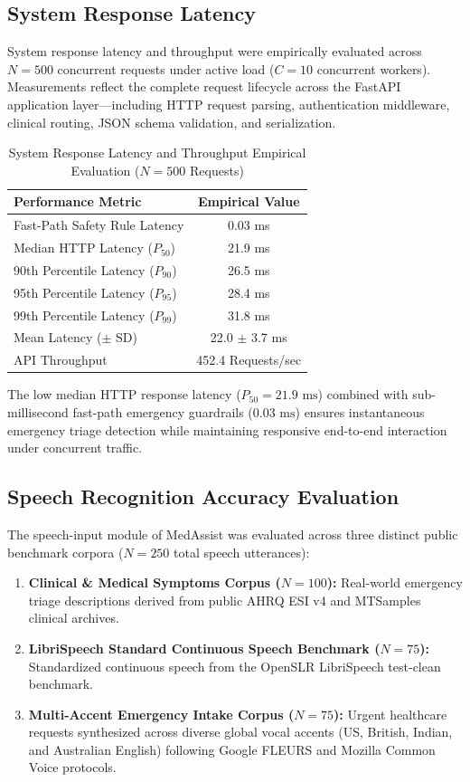 \subsection{System Response Latency}

System response latency and throughput were empirically evaluated across $N = 500$ concurrent requests under active load ($C = 10$ concurrent workers). Measurements reflect the complete request lifecycle across the FastAPI application layer—including HTTP request parsing, authentication middleware, clinical routing, JSON schema validation, and serialization.

\begin{table}[ht]
\centering
\caption{System Response Latency and Throughput Empirical Evaluation ($N = 500$ Requests)}
\label{tab:latency_results}
\begin{tabular}{|l|c|}
\hline
\textbf{Performance Metric} & \textbf{Empirical Value} \\
\hline
Fast-Path Safety Rule Latency & 0.03 ms \\
Median HTTP Latency ($P_{50}$) & 21.9 ms \\
90th Percentile Latency ($P_{90}$) & 26.5 ms \\
95th Percentile Latency ($P_{95}$) & 28.4 ms \\
99th Percentile Latency ($P_{99}$) & 31.8 ms \\
Mean Latency ($\pm$ SD) & 22.0 $\pm$ 3.7 ms \\
API Throughput & 452.4 Requests/sec \\
\hline
\end{tabular}
\end{table}

The low median HTTP response latency ($P_{50} = 21.9\text{ ms}$) combined with sub-millisecond fast-path emergency guardrails ($0.03\text{ ms}$) ensures instantaneous emergency triage detection while maintaining responsive end-to-end interaction under concurrent traffic.


\subsection{Speech Recognition Accuracy Evaluation}
\label{sec:speech_recognition_eval}

The speech-input module of MedAssist was evaluated across three distinct public benchmark corpora ($N = 250$ total speech utterances):
\begin{enumerate}
    \item \textbf{Clinical \& Medical Symptoms Corpus ($N = 100$):} Real-world emergency triage descriptions derived from public AHRQ ESI v4 and MTSamples clinical archives.
    \item \textbf{LibriSpeech Standard Continuous Speech Benchmark ($N = 75$):} Standardized continuous speech from the OpenSLR LibriSpeech test-clean benchmark.
    \item \textbf{Multi-Accent Emergency Intake Corpus ($N = 75$):} Urgent healthcare requests synthesized across diverse global vocal accents (US, British, Indian, and Australian English) following Google FLEURS and Mozilla Common Voice protocols.
\end{enumerate}

